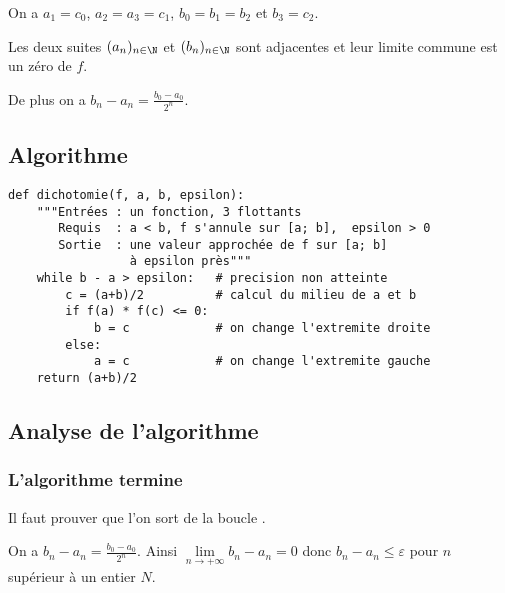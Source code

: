 On a $a_1=c_0$, $a_2=a_3=c_1$, $b_0=b_1=b_2$ et $b_3=c_2$.

  \begin{thm}
Les deux suites  $(a_n)_{n\in \N}$ et $(b_n)_{n\in \N}$ sont adjacentes et leur limite commune est un zéro de $f$.

De plus on a $\displaystyle b_n - a_n= \frac{b_0-a_0} {2^n}$.\end{thm}
\subsection{Algorithme}
\begin{lstlisting}[caption = {Calcul d'un zéro par dichotomie}]
def dichotomie(f, a, b, epsilon):
    """Entrées : un fonction, 3 flottants
       Requis  : a < b, f s'annule sur [a; b],  epsilon > 0
       Sortie  : une valeur approchée de f sur [a; b] 
                 à epsilon près"""
    while b - a > epsilon:   # precision non atteinte
        c = (a+b)/2          # calcul du milieu de a et b
        if f(a) * f(c) <= 0:
            b = c            # on change l'extremite droite
        else:
            a = c            # on change l'extremite gauche
    return (a+b)/2
\end{lstlisting}
\subsection{Analyse de l'algorithme}
\subsubsection{L'algorithme termine}
  Il faut prouver que l'on sort de la boucle .
  
  On a $\displaystyle b_n - a_n= \frac{b_0-a_0} {2^n}$. Ainsi $\lim\limits_{n\rightarrow +\infty} b_n - a_n=0$ donc $b_n - a_n \le \varepsilon$ pour $n$ supérieur à un entier $N$.
  
